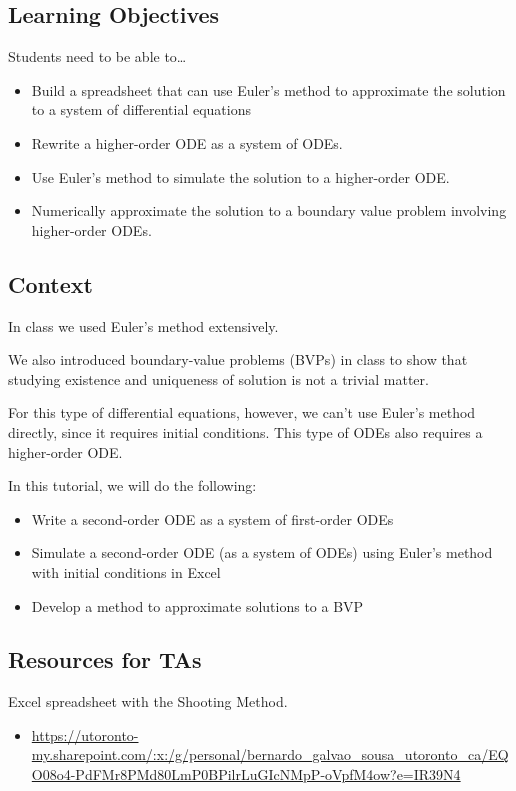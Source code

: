 \subsection*{Learning Objectives}
	Students need to be able to\ldots
	\begin{itemize}
		\item Build a spreadsheet that can use Euler's method to approximate the solution to a system of differential equations
		\item Rewrite a higher-order ODE as a system of ODEs.
		\item Use Euler's method to simulate the solution to a higher-order ODE.
		\item Numerically approximate the solution to a boundary value problem involving higher-order ODEs.
	\end{itemize}

\subsection*{Context}
	
In class we used Euler's method extensively.

We also introduced boundary-value problems (BVPs) in class to show that studying existence and uniqueness of solution is not a trivial matter.

For this type of differential equations, however, we can't use Euler's method directly, since it requires initial conditions.
This type of ODEs also requires a higher-order ODE.

In this tutorial, we will do the following:
\begin{itemize}
	\item Write a second-order ODE as a system of first-order ODEs
	\item Simulate a second-order ODE (as a system of ODEs) using Euler's method with initial conditions in Excel
	\item Develop a method to approximate solutions to a BVP
\end{itemize}


\subsection*{Resources for TAs}

Excel spreadsheet with the Shooting Method. 

\begin{itemize}
	\item \url{https://utoronto-my.sharepoint.com/:x:/g/personal/bernardo_galvao_sousa_utoronto_ca/EQO08o4-PdFMr8PMd80LmP0BPilrLuGIcNMpP-oVpfM4ow?e=IR39N4}
\end{itemize}


